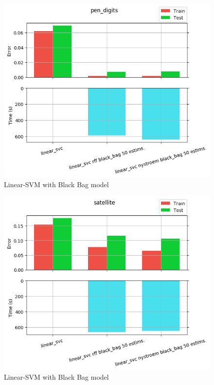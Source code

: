 \begin{figure}[th]
\centering
\includegraphics[scale=\imgscale]{Figures/2_6/pen_digits}
\decoRule
\caption[2.6 pen\tu digits]{Linear-SVM with Black Bag model}
\label{fig:2_6_pen_digits}
\end{figure}

\begin{figure}[th]
\centering
\includegraphics[scale=\imgscale]{Figures/2_6/satellite}
\decoRule
\caption[2.6 satellite]{Linear-SVM with Black Bag model}
\label{fig:2_6_satellite}
\end{figure}

